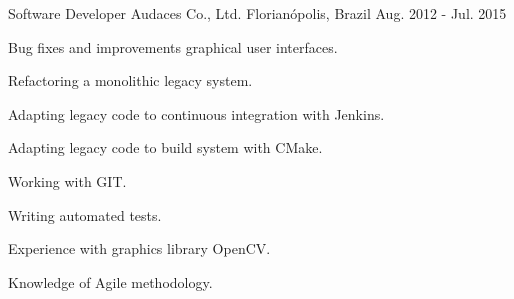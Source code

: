 \begin{cventries}
  \cventry
    {Software Developer} %
    {Audaces Co., Ltd.} %
    {Florianópolis, Brazil} %
    {Aug. 2012 - Jul. 2015} %
    {
      \begin{cvitems} %
        \item {Bug fixes and improvements graphical user interfaces.}
        \item {Refactoring a monolithic legacy system.}
        \item {Adapting legacy code to continuous integration with Jenkins.}
        \item {Adapting legacy code to build system with CMake.}
        \item {Working with GIT.}
        \item {Writing automated tests.}
        \item {Experience with graphics library OpenCV.}
        \item {Knowledge of Agile methodology.}
      \end{cvitems}
    }

\end{cventries}
